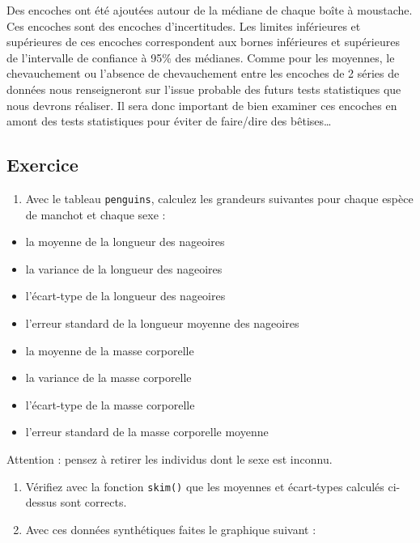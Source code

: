 \documentclass[
  a4paper,
  DIV=11,
  numbers=noendperiod,
  oneside]{scrreprt}
\providecommand{\tightlist}{%
  \setlength{\itemsep}{0pt}\setlength{\parskip}{0pt}}\usepackage{longtable,booktabs,array}
\begin{document}
Des encoches ont été ajoutées autour de la médiane de chaque boîte à
moustache. Ces encoches sont des encoches d'incertitudes. Les limites
inférieures et supérieures de ces encoches correspondent aux bornes
inférieures et supérieures de l'intervalle de confiance à 95\% des
médianes. Comme pour les moyennes, le chevauchement ou l'absence de
chevauchement entre les encoches de 2 séries de données nous
renseigneront sur l'issue probable des futurs tests statistiques que
nous devrons réaliser. Il sera donc important de bien examiner ces
encoches en amont des tests statistiques pour éviter de faire/dire des
bêtises\ldots{}

\hypertarget{exercice-1}{%
\subsection{Exercice}\label{exercice-1}}

\begin{enumerate}
\def\labelenumi{\arabic{enumi}.}
\tightlist
\item
  Avec le tableau \texttt{penguins}, calculez les grandeurs suivantes
  pour chaque espèce de manchot et chaque sexe :
\end{enumerate}

\begin{itemize}
\tightlist
\item
  la moyenne de la longueur des nageoires
\item
  la variance de la longueur des nageoires
\item
  l'écart-type de la longueur des nageoires
\item
  l'erreur standard de la longueur moyenne des nageoires
\item
  la moyenne de la masse corporelle
\item
  la variance de la masse corporelle
\item
  l'écart-type de la masse corporelle
\item
  l'erreur standard de la masse corporelle moyenne
\end{itemize}

Attention : pensez à retirer les individus dont le sexe est inconnu.

\begin{enumerate}
\def\labelenumi{\arabic{enumi}.}
\setcounter{enumi}{1}
\item
  Vérifiez avec la fonction \texttt{skim()} que les moyennes et
  écart-types calculés ci-dessus sont corrects.
\item
  Avec ces données synthétiques faites le graphique suivant :
\end{enumerate}
\end{document}
